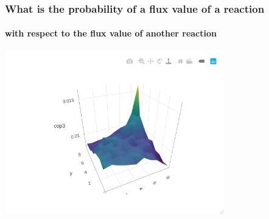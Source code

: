 \documentclass{beamer}
\begin{document}



   \begin{frame}
      \frametitle{What is the probability of a flux value of a reaction}
      \framesubtitle{with respect to the flux value of another reaction}
      \centering
      \includegraphics[width=95mm]{resources/hex_-_g6pper_transp.png}
   \end{frame}
\end{document}
